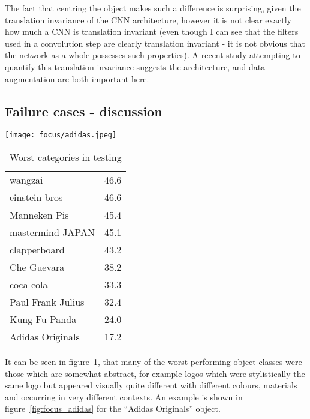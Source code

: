The fact that centring the object makes such a difference is surprising, given the translation invariance of the CNN architecture, however it is not clear exactly how much a CNN is translation invariant (even though I can see that the filters used in a convolution step are clearly translation invariant - it is not obvious that the network as a whole possesses such properties). A recent study attempting to quantify this translation invariance \cite{EricKauderer-Abrams2016} suggests the architecture, and data augmentation are both important here. 


\subsection {Failure cases - discussion}


\begin{figure*}[t]
    \caption{Example of one hard case in the INSTRE dataset}
\centering
\texttt{[image: focus/adidas.jpeg]}
\label{fig:focus_adidas}
\end{figure*}



\begin{table}[h]
  \centering
    \caption{Worst categories in testing }
  \begin{tabular}{ l l }
  wangzai & 46.6 \\
  einstein bros & 46.6\\
  Manneken Pis & 45.4\\
  mastermind JAPAN & 45.1\\
  clapperboard & 43.2\\
  Che Guevara & 38.2\\
  coca cola & 33.3\\
  Paul Frank Julius & 32.4\\
  Kung Fu Panda & 24.0\\
  Adidas Originals & 17.2\\
    \bottomrule
  \end{tabular}
\label{fig:focus_failure}
\end{table}

It can be seen in figure~\ref{fig:focus_failure}, that many of the worst performing object classes were those which are somewhat abstract, for example logos which were stylistically the same logo but appeared visually quite different with different colours, materials and occurring in very different contexts. An example is shown in figure~\ref{fig:focus_adidas} for the ``Adidas Originals'' object.

